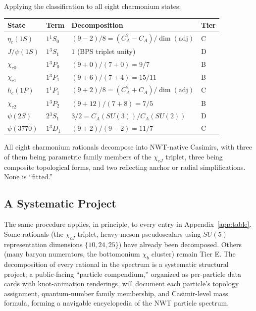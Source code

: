 \documentclass[11pt]{article}
\newcommand{\CA}{C_A}
\begin{document}
Applying the classification to all eight charmonium states:
\begin{center}
\begin{tabular}{llll}
\toprule
State & Term & Decomposition & Tier \\
\midrule
$\eta_c(1S)$   & $1{}^1S_0$ & $(9-2)/8 = (\CA^2 - \CA)/\dim(\mathrm{adj})$ & C \\
$J/\psi(1S)$   & $1{}^3S_1$ & $1$ (BPS triplet unity)                      & D \\
$\chi_{c0}$    & $1{}^3P_0$ & $(9+0)/(7+0) = 9/7$                           & B \\
$\chi_{c1}$    & $1{}^3P_1$ & $(9+6)/(7+4) = 15/11$                         & B \\
$h_c(1P)$      & $1{}^1P_1$ & $(9+2)/8 = (\CA^2 + \CA)/\dim(\mathrm{adj})$ & C \\
$\chi_{c2}$    & $1{}^3P_2$ & $(9+12)/(7+8) = 7/5$                          & B \\
$\psi(2S)$     & $2{}^3S_1$ & $3/2 = \CA(SU(3))/\CA(SU(2))$                 & D \\
$\psi(3770)$   & $1{}^3D_1$ & $(9+2)/(9-2) = 11/7$                          & C \\
\bottomrule
\end{tabular}
\end{center}
All eight charmonium rationals decompose into NWT-native
Casimirs, with three of them being parametric family members
of the $\chi_{cJ}$ triplet, three being composite topological
forms, and two reflecting anchor or radial simplifications.
None is ``fitted.''

\subsection{A Systematic Project}

The same procedure applies, in principle, to every entry in
Appendix~\ref{app:table}.  Some rationals (the $\chi_{cJ}$
triplet, heavy-meson pseudoscalars using $SU(5)$ representation
dimensions $\{10, 24, 25\}$) have already been decomposed.
Others (many baryon numerators, the bottomonium $\chi_b$ cluster)
remain Tier E.  The decomposition of every rational in the
spectrum is a systematic structural project; a public-facing
``particle compendium,'' organized as per-particle data cards
with knot-animation renderings, will document each particle's
topology assignment, quantum-number family membership, and
Casimir-level mass formula, forming a navigable encyclopedia of
the NWT particle spectrum.
\end{document}
